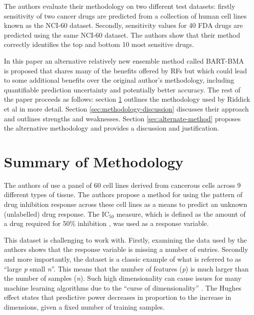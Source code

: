 \documentclass[journal]{IEEEtran}
\begin{document}
The authors evaluate their methodology on two different test datasets: firstly sensitivity of two cancer drugs are predicted from a collection of human cell lines known as the NCI-60 dataset. Secondly, sensitivity values for 40 FDA drugs are predicted using the same NCI-60 dataset. The authors show that their method correctly identifies the top and bottom 10 most sensitive drugs. 

In this paper an alternative relatively new ensemble method called BART-BMA is proposed that shares many of the benefits offered by RFs but which could lead to some additional benefits over the original author's methodology, including quantifiable prediction uncertainty and potentially better accuracy. The rest of the paper proceeds as follows: section \ref{sec:original-methodology} outlines the methodology used by Riddick et al in more detail. Section \ref{sec:methodology-discussion} discusses their approach and outlines strengths and weaknesses. Section \ref{sec:alternate-method} proposes the alternative methodology and provides a discussion and justification.

\section{Summary of Methodology}
\label{sec:original-methodology}

The authors of \cite{riddick2011predicting} use a panel of 60 cell lines derived from cancerous cells across 9 different types of tissue. The authors propose a method for using the pattern of drug inhibition response across these cell lines as a means to predict an unknown (unlabelled) drug response. The IC$_{50}$ measure, which is defined as the amount of a drug required for 50\% inhibition \cite{FDA-IC50}, was used as a response variable.

This dataset is challenging to work with. Firstly, examining the data used by the authors shows that the response variable is missing a number of entries. Secondly and more importantly, the dataset is a classic example of what is referred to as ``large \textit{p} small \textit{n}''. This means that the number of features (\textit{p}) is much larger than the number of samples (\textit{n}). Such high dimensionality can cause issues for many machine learning algorithms due to the ``curse of dimensionality'' \cite{bellman1957dynamic}. The Hughes effect \cite{hughes1968mean} states that predictive power decreases in proportion to the increase in dimensions, given a fixed number of training samples.
\end{document}
